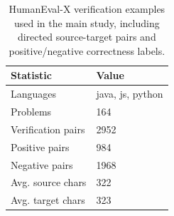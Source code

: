 \begin{table}[!htbp]
\centering
\scriptsize
\begin{tabular}{ll}
\toprule
Statistic & Value \\
\midrule
Languages & java, js, python \\
Problems & 164 \\
Verification pairs & 2952 \\
Positive pairs & 984 \\
Negative pairs & 1968 \\
Avg. source chars & 322 \\
Avg. target chars & 323 \\
\bottomrule
\end{tabular}
\vspace{0.5em}
\caption{HumanEval-X verification examples used in the main study, including directed source-target pairs and positive/negative correctness labels.}
\label{tab:dataset-statistics}
\end{table}
